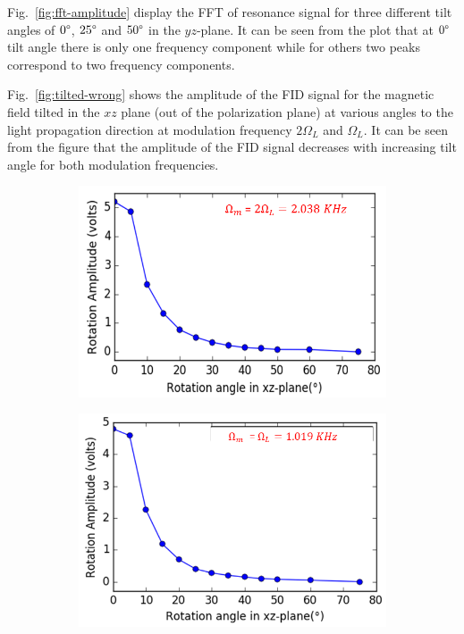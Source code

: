 Fig.~\ref{fig:fft-amplitude} display the FFT of resonance signal for
three different tilt angles of $0\degree$, $25\degree$ and $50\degree$
in the $yz$-plane. It can be seen from the plot that at $0\degree$
tilt angle there is only one frequency component while for others two
peaks correspond to two frequency components.

Fig.~\ref{fig:tilted-wrong} shows the amplitude of the FID signal for
the magnetic field tilted in the $xz$ plane (out of the polarization
plane) at various angles to the light propagation direction at
modulation frequency $2\Omega_L$ and $\Omega_L$. It can be seen from
the figure that the amplitude of the FID signal decreases with
increasing tilt angle for both modulation frequencies.
\begin{figure}
    \centering
   \begin{subfigure}[b]{0.45\textwidth}
        \centering
        \includegraphics[width=\textwidth]{figures/tilt_x_larmor.png}
        \caption{}
        \label{fig:y equals x}
    \end{subfigure}
    \hfill
     \begin{subfigure}[b]{0.45\textwidth}
        \centering
        \includegraphics[width=\textwidth]{figures/tilt_x_2larmor.png}

\end{subfigure}
\end{figure}
